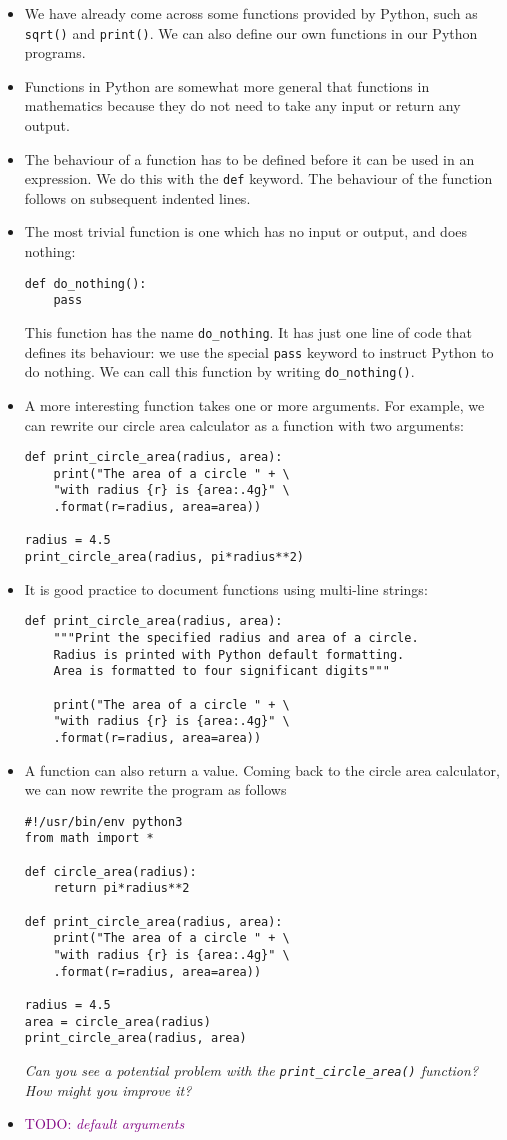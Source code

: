 \documentclass[a4paper,twoside]{memoir}
\newcommand{\shellcmd}{\texttt}
\newcommand{\TODO}[1]{\textcolor{purple}{TODO: \emph{#1}}}
\begin{document}
\begin{itemize}
	\item We have already come across some functions provided by Python, such as \shellcmd{sqrt()} and \shellcmd{print()}.  We can also define our own functions in our Python programs.
	\item Functions in Python are somewhat more general that functions in mathematics because they do not need to take any input or return any output.
	\item The behaviour of a function has to be defined before it can be used in an expression.  We do this with the \shellcmd{def} keyword.  The behaviour of the function follows on subsequent indented lines.
	\item The most trivial function is one which has no input or output, and does nothing:
\begin{verbatim}
def do_nothing():
	pass
\end{verbatim}
This function has the name \shellcmd{do\_nothing}.  It has just one line of code that defines its behaviour: we use the special \shellcmd{pass} keyword to instruct Python to do nothing.  We can call this function by writing \shellcmd{do\_nothing()}.
	\item A more interesting function takes one or more arguments.  For example, we can rewrite our circle area calculator as a function with two arguments:
\begin{verbatim}
def print_circle_area(radius, area):
	print("The area of a circle " + \
	"with radius {r} is {area:.4g}" \
	.format(r=radius, area=area))

radius = 4.5
print_circle_area(radius, pi*radius**2)
\end{verbatim}
\item It is good practice to document functions using multi-line strings:
\begin{verbatim}
def print_circle_area(radius, area):
	"""Print the specified radius and area of a circle.
	Radius is printed with Python default formatting.
	Area is formatted to four significant digits"""

	print("The area of a circle " + \
	"with radius {r} is {area:.4g}" \
	.format(r=radius, area=area))
\end{verbatim}

\item A function can also return a value.  Coming back to the circle area calculator, we can now rewrite the program as follows
\begin{verbatim}
#!/usr/bin/env python3
from math import *

def circle_area(radius):
	return pi*radius**2

def print_circle_area(radius, area):
	print("The area of a circle " + \
	"with radius {r} is {area:.4g}" \
	.format(r=radius, area=area))

radius = 4.5
area = circle_area(radius)
print_circle_area(radius, area)
\end{verbatim}
\textit{Can you see a potential problem with the \texttt{print\_circle\_area()} function?  How might you improve it?}
\item \TODO{default arguments}
\end{itemize}
\end{document}
